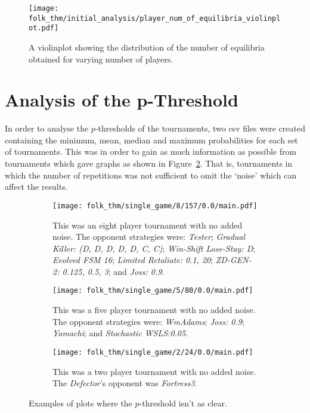 \begin{figure}      
    \centering
    \texttt{[image: folk\_thm/initial\_analysis/player\_num\_of\_equilibria\_violinplot.pdf]}
    \caption{A violinplot showing the distribution of the number of equilibria obtained for varying number of players.}\label{fig:NE_violinplot}
\end{figure}



\section{Analysis of the p-Threshold}\label{sec:Analysis_of_the_p-Threshold}
In order to analyse the \(p\)-thresholds of the tournaments, two csv files were
created containing the minimum, mean, median and maximum probabilities for each
set of tournaments. This was in order to gain as much information as possible
from tournaments which gave graphs as shown in Figure~\ref{fig:less_clear}. That
is, tournaments in which the number of repetitions was not sufficient to omit
the `noise' which can affect the results.

\begin{figure}
    \begin{subfigure}{.3\textwidth}
        \centering
        \texttt{[image: folk\_thm/single\_game/8/157/0.0/main.pdf]}
        \caption{This was an eight player tournament with no added noise. The opponent strategies were: \textit{Tester}; \textit{Gradual Killer: (D, D, D, D, D, C, C)}; \textit{Win-Shift Lose-Stay: D}; \textit{Evolved FSM 16}; \textit{Limited Retaliate: 0.1, 20}; \textit{ZD-GEN-2: 0.125, 0.5, 3}; and \textit{Joss: 0.9}.}
    \end{subfigure}
    \begin{subfigure}{.3\textwidth}
        \centering
        \texttt{[image: folk\_thm/single\_game/5/80/0.0/main.pdf]}
        \caption{This was a five player tournament with no added noise. The opponent strategies were: \textit{WmAdams}; \textit{Joss: 0.9}; \textit{Yamachi}; and \textit{Stochastic WSLS:\@ 0.05}.}
    \end{subfigure}
    \begin{subfigure}{.3\textwidth}
        \centering
        \texttt{[image: folk\_thm/single\_game/2/24/0.0/main.pdf]}
        \caption{This was a two player tournament with no added noise. The \textit{Defector}'s opponent was \textit{Fortress3}.}
    \end{subfigure}
    \caption{Examples of plots where the \(p\)-threshold isn't as clear.}\label{fig:less_clear}
\end{figure}

